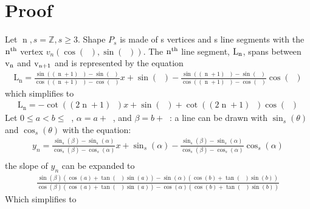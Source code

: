 \documentclass[11pt]{article}
\DeclareMathOperator{\custd}{\mathrm{d}_s}
\DeclareMathOperator{\custi}{\mathrm{n}}
\DeclareMathOperator{\period}{\frac{2\pi}{s}}
\DeclareMathOperator{\hp}{\frac{\pi}{s}}
\DeclareMathOperator{\iperiod}{\custi\frac{2\pi}{s}}
\begin{document}
\section{Proof}
Let \(\custi,s=\mathbb{Z},s\geq3\). Shape \(P_s\) is made of s vertices and s line segments with the \(\rm n^{th}\) vertex \(v_n(\cos(\iperiod), \sin(\iperiod))\). The \(\rm n^{th}\) line segment, \(\rm L_n\), spans between \(\rm v_n\) and \(\rm v_{n+1}\) and is represented by the equation
\begin{gather*}
\mathrm{L_n}=\frac{\sin((\custi+1)\period)-\sin(\iperiod)}{\cos((\custi+1)\period)-\cos(\iperiod)}x+\sin(\iperiod)-\frac{\sin((\custi+1)\period)-\sin(\iperiod)}{\cos((\custi+1)\period)-\cos(\iperiod)}\cos(\iperiod)
\end{gather*}
which simplifies to
\begin{gather*}
\mathrm{L_n}=-\cot((2\custi+1)\hp)x+\sin(\iperiod)+\cot((2\custi+1)\hp)\cos(\iperiod)
\end{gather*}
Let \(0\leq a<b\leq\period\), \(\alpha=a+\iperiod\), and \(\beta=b+\iperiod\): a line can be drawn with \(\sin_s(\theta)\) and \(\cos_s(\theta)\) with the equation:
\begin{gather*}
y_n=\frac{\sin_s(\beta)-\sin_s(\alpha)}{\cos_s(\beta)-\cos_s(\alpha)}x+\sin_s(\alpha)-\frac{\sin_s(\beta)-\sin_s(\alpha)}{\cos_s(\beta)-\cos_s(\alpha)}\cos_s(\alpha)\\
\end{gather*}
the slope of \(y_n\) can be expanded to
\begin{gather*}
\frac{\sin(\beta)(\cos(a)+\tan(\hp)\sin(a))-\sin(\alpha)(\cos(b)+\tan(\hp)\sin(b))}{\cos(\beta)(\cos(a)+\tan(\hp)\sin(a))-\cos(\alpha)(\cos(b)+\tan(\hp)\sin(b))}
\end{gather*}
Which simplifies to
\end{document}
